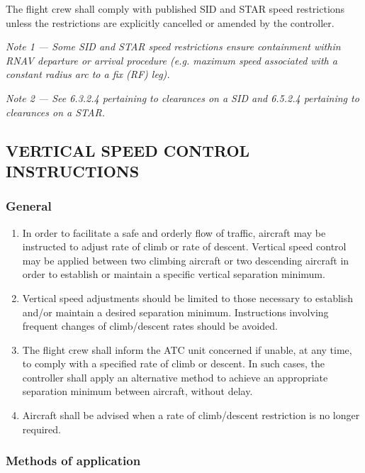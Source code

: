 \documentclass[../main.tex]{subfiles}
\begin{document}
    The flight crew shall comply with published SID and STAR speed restrictions unless the restrictions are explicitly cancelled or amended by the controller.

    \textit{Note 1 --- Some SID and STAR speed restrictions ensure containment within RNAV departure or arrival procedure (e.g. maximum speed associated with a constant radius arc to a fix (RF) leg).}

    \textit{Note 2 --- See 6.3.2.4 pertaining to clearances on a SID and 6.5.2.4 pertaining to clearances on a STAR.}

    \subsection[Vertical speed control instructions]{VERTICAL SPEED CONTROL INSTRUCTIONS}

    \subsubsection{General}

    \begin{enumerate}
        \item In order to facilitate a safe and orderly flow of traffic, aircraft may be instructed to adjust rate of climb or rate of descent. Vertical speed control may be applied between two climbing aircraft or two descending aircraft in order to establish or maintain a specific vertical separation minimum.
        \item Vertical speed adjustments should be limited to those necessary to establish and/or maintain a desired separation minimum. Instructions involving frequent changes of climb/descent rates should be avoided.
        \item The flight crew shall inform the ATC unit concerned if unable, at any time, to comply with a specified rate of climb or descent. In such cases, the controller shall apply an alternative method to achieve an appropriate separation minimum between aircraft, without delay.
        \item Aircraft shall be advised when a rate of climb/descent restriction is no longer required.
    \end{enumerate}

    \subsubsection{Methods of application}
\end{document}
